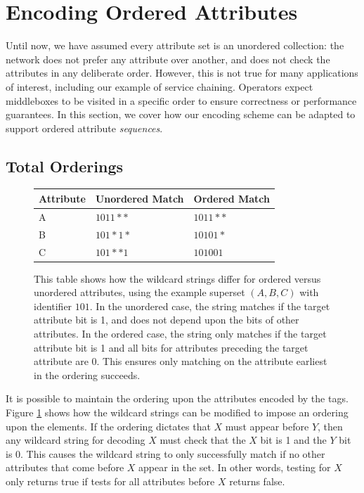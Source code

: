 \section{Encoding Ordered Attributes} 
\label{sec:ordering}
Until now, we have assumed every attribute set is an unordered collection: the network does not prefer any attribute over another, and does not check the attributes in any deliberate order. However, this is not true for many applications of interest, including our example of service chaining. Operators expect middleboxes to be visited in a specific order to ensure correctness or performance guarantees. In this section, we cover how our encoding scheme can be adapted to support ordered attribute \textit{sequences}.


\subsection{Total Orderings}
\begin{figure}
    \begin{tabular}{| l | l | l |}
    \hline
    Attribute & Unordered Match & Ordered Match\\ \hline
    A & $1011**$ & $1011**$ \\ \hline
    B & $101*1*$ & $10101*$ \\ \hline
    C & $101**1$ & $101001$ \\
    \hline
    \end{tabular}
    \caption{This table shows how the wildcard strings differ for ordered versus unordered attributes, using the example superset $(A,B,C)$ with identifier $101$. In the unordered case, the string matches if the target attribute bit is 1, and does not depend upon the bits of other attributes. In the ordered case, the string only matches if the target attribute bit is 1 and all bits for attributes preceding the target attribute are 0. This ensures only matching on the attribute earliest in the ordering succeeds.} 
    \label{tab:ordering}
\end{figure}


It is possible to maintain the ordering upon the attributes encoded by the tags. Figure \ref{tab:ordering} shows how the wildcard strings can be modified to impose an ordering upon the elements. If the ordering dictates that $X$ must appear before $Y$, then any wildcard string for decoding $X$ must check that the $X$ bit is 1 and the $Y$ bit is 0. This causes the wildcard string to only successfully match if no other attributes that come before $X$ appear in the set. In other words, testing for $X$ only returns true if tests for all attributes before $X$ returns false. 

